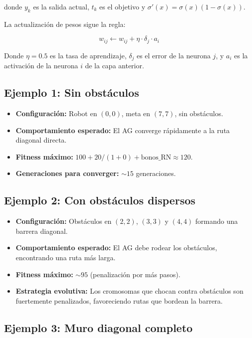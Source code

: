 \documentclass[12pt,a4paper]{article}
\begin{document}
donde $y_k$ es la salida actual, $t_k$ es el objetivo y $\sigma'(x) = \sigma(x)(1 - \sigma(x))$.

La actualizaci\'on de pesos sigue la regla:

\[
w_{ij} \leftarrow w_{ij} + \eta \cdot \delta_j \cdot a_i
\]

Donde $\eta = 0.5$ es la tasa de aprendizaje, $\delta_j$ es el error de la neurona $j$, y $a_i$ es la activaci\'on de la neurona $i$ de la capa anterior.

\subsection{Ejemplo 1: Sin obst\'aculos}

\begin{itemize}
  \item \textbf{Configuraci\'on:} Robot en $(0,0)$, meta en $(7,7)$, sin obst\'aculos.
  \item \textbf{Comportamiento esperado:} El AG converge r\'apidamente a la ruta diagonal directa.
  \item \textbf{Fitness m\'aximo:} $100 + 20/(1+0) + \text{bonos\_RN} \approx 120$.
  \item \textbf{Generaciones para converger:} $\sim 15$ generaciones.
\end{itemize}

\subsection{Ejemplo 2: Con obst\'aculos dispersos}

\begin{itemize}
  \item \textbf{Configuraci\'on:} Obst\'aculos en $(2,2)$, $(3,3)$ y $(4,4)$ formando una barrera diagonal.
  \item \textbf{Comportamiento esperado:} El AG debe rodear los obst\'aculos, encontrando una ruta m\'as larga.
  \item \textbf{Fitness m\'aximo:} $\sim 95$ (penalizaci\'on por m\'as pasos).
  \item \textbf{Estrategia evolutiva:} Los cromosomas que chocan contra obst\'aculos son fuertemente penalizados, favoreciendo rutas que bordean la barrera.
\end{itemize}

\subsection{Ejemplo 3: Muro diagonal completo}
\end{document}
